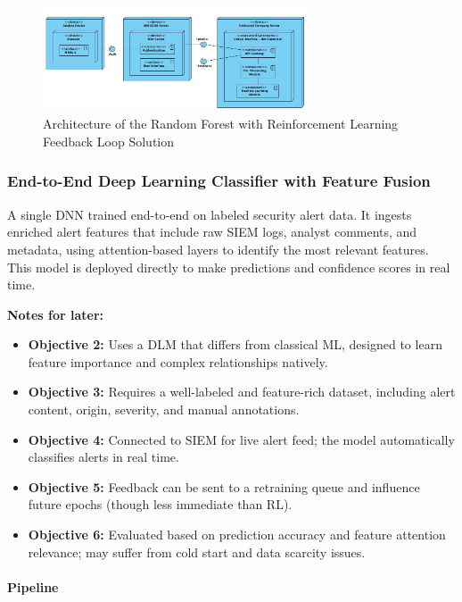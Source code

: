 \begin{figure}[h!]
    \centering
    \includegraphics[width=0.7\textwidth]{ch3/assets/Soltution1_Archquiteture.png}
    \caption{Architecture of the Random Forest with Reinforcement Learning Feedback Loop Solution}
    \label{fig:solution1_architecture}
\end{figure}

\subsubsection{End-to-End Deep Learning Classifier with Feature Fusion}
A single \gls{DNN} trained end-to-end on labeled security alert data. 
It ingests enriched alert features that include raw SIEM logs, analyst comments, and metadata, using attention-based layers to identify the most relevant features. 
This model is deployed directly to make predictions and confidence scores in real time.

\textbf{Notes for later:}
\begin{itemize}
    \item \textbf{Objective 2:} Uses a \gls{DLM} that differs from classical \gls{ML}, designed to learn feature importance and complex relationships natively.
    \item \textbf{Objective 3:} Requires a well-labeled and feature-rich dataset, including alert content, origin, severity, and manual annotations.
    \item \textbf{Objective 4:} Connected to \gls{SIEM} for live alert feed; the model automatically classifies alerts in real time.
    \item \textbf{Objective 5:} Feedback can be sent to a retraining queue and influence future epochs (though less immediate than \gls{RL}).
    \item \textbf{Objective 6:} Evaluated based on prediction accuracy and feature attention relevance; may suffer from cold start and data scarcity issues.
\end{itemize}

\paragraph{Pipeline}
